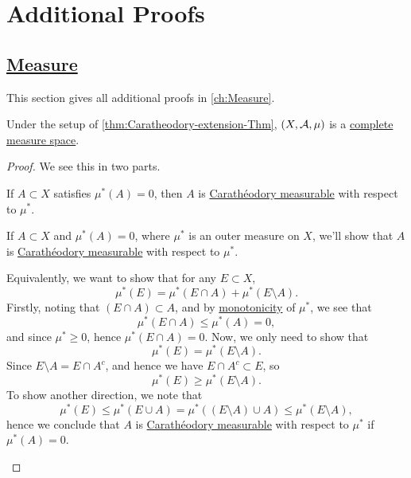 \chapter{Additional Proofs}\label{Apx:Additional-Proofs}
\section{\hyperref[ch:Measure]{Measure}}
This section gives all additional proofs in \autoref{ch:Measure}.
\begin{theorem}\label{thm:Caratheodory-extension-Thm:3.}
	Under the setup of \autoref{thm:Caratheodory-extension-Thm}, \((X, \mathcal{\MakeUppercase{a}} , \mu )\) is a \hyperref[def:complete-measure-space]{complete measure space}.
\end{theorem}
\begin{proof}
	We see this in two parts.
	\begin{claim}
		If \(A\subset X\) satisfies \(\mu ^{\ast} (A) = 0\), then \(A\) is \hyperref[def:C-measurable]{Carathéodory measurable} with respect to \(\mu ^{\ast} \).
	\end{claim}
	\begin{explanation}
		If \(A\subset X\) and \(\mu^{\ast} (A) = 0\), where \(\mu^{\ast} \) is an outer measure on \(X\), we'll show that \(A\) is \hyperref[def:C-measurable]{Carathéodory measurable}
		with respect to \(\mu^{\ast} \).

		\par Equivalently, we want to show that for any \(E\subset X\),
		\[
			\mu^{\ast} (E) = \mu^{\ast} (E\cap A) + \mu^{\ast} (E \setminus A).
		\]
		Firstly, noting that \((E\cap A)\subset A\), and by \hyperref[def:outer-measure-montonicity]{monotonicity} of \(\mu^{\ast} \), we see that
		\[
			\mu^{\ast} (E\cap A)\leq \mu^{\ast} (A) = 0,
		\]
		and since \(\mu^{\ast} \geq 0\), hence \(\mu^{\ast} (E\cap A) = 0\). Now, we only need to show that
		\[
			\mu^{\ast} (E) = \mu^{\ast} (E\setminus A).
		\]
		Since \(E\setminus A = E\cap A^{c} \), and hence we have \(E\cap A^{c} \subset E\), so
		\[
			\mu^{\ast} (E)\geq \mu^{\ast} (E\setminus A).
		\]
		To show another direction, we note that
		\[
			\mu^{\ast} (E)\leq \mu^{\ast} (E\cup A) = \mu^{\ast} ((E\setminus A) \cup A) \leq \mu^{\ast} (E\setminus A),
		\]
		hence we conclude that \(A\) is \hyperref[def:C-measurable]{Carathéodory measurable} with respect to \(\mu^{\ast} \) if \(\mu^{\ast} (A)=0\).
	\end{explanation}


\end{proof}
